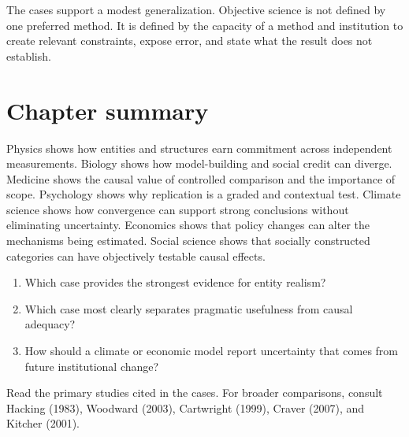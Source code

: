 The cases support a modest generalization. Objective science is not defined by
one preferred method. It is defined by the capacity of a method and institution
to create relevant constraints, expose error, and state what the result does
not establish.

\section*{Chapter summary}

Physics shows how entities and structures earn commitment across independent
measurements. Biology shows how model-building and social credit can diverge.
Medicine shows the causal value of controlled comparison and the importance of
scope. Psychology shows why replication is a graded and contextual test.
Climate science shows how convergence can support strong conclusions without
eliminating uncertainty. Economics shows that policy changes can alter the
mechanisms being estimated. Social science shows that socially constructed
categories can have objectively testable causal effects.

\begin{discussion}
\begin{enumerate}
\item Which case provides the strongest evidence for entity realism?
\item Which case most clearly separates pragmatic usefulness from causal
adequacy?
\item How should a climate or economic model report uncertainty that comes from
future institutional change?
\end{enumerate}
\end{discussion}

\begin{furtherreading}
Read the primary studies cited in the cases. For broader comparisons, consult
Hacking (1983), Woodward (2003), Cartwright (1999), Craver (2007), and Kitcher
(2001).
\end{furtherreading}

